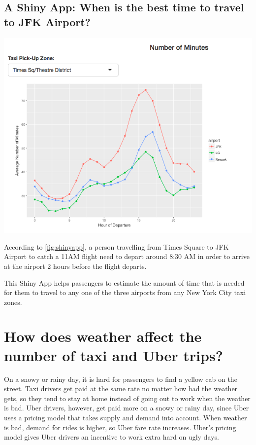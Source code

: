 \documentclass[12pt,twoside]{reedthesis}
\theoremstyle{definition}
\theoremstyle{definition}
\theoremstyle{definition}
\theoremstyle{remark}
\begin{document}
\subsection{A Shiny App: When is the best time to travel to JFK
Airport?}\label{a-shiny-app-when-is-the-best-time-to-travel-to-jfk-airport}
\begin{center}\includegraphics[width=6.74in]{figure/shinyapp} \end{center}

According to \ref{fig:shinyapp}, a person travelling from Times Square
to JFK Airport to catch a 11AM flight need to depart around 8:30 AM in
order to arrive at the airport 2 hours before the flight departs.

This Shiny App helps passengers to estimate the amount of time that is
needed for them to travel to any one of the three airports from any New
York City taxi zones.

\section{How does weather affect the number of taxi and Uber
trips?}\label{how-does-weather-affect-the-number-of-taxi-and-uber-trips}

On a snowy or rainy day, it is hard for passengers to find a yellow cab
on the street. Taxi drivers get paid at the same rate no matter how bad
the weather gets, so they tend to stay at home instead of going out to
work when the weather is bad. Uber drivers, however, get paid more on a
snowy or rainy day, since Uber uses a pricing model that takes supply
and demand into account. When weather is bad, demand for rides is
higher, so Uber fare rate increases. Uber's pricing model gives Uber
drivers an incentive to work extra hard on ugly days.
\end{document}
